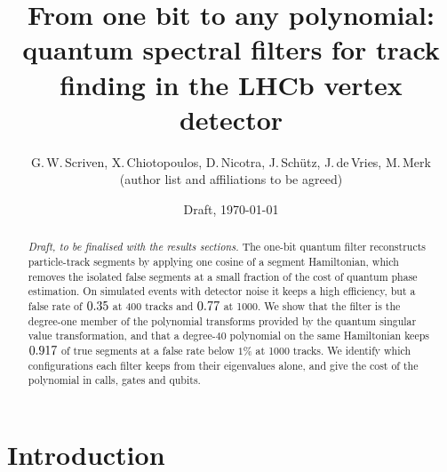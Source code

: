\documentclass[11pt,a4paper]{article}
\title{From one bit to any polynomial:\\ quantum spectral filters for track finding in the LHCb vertex detector}
\author{G.\,W.\,Scriven, X.\,Chiotopoulos, D.\,Nicotra, J.\,Sch\"utz, J.\,de\,Vries, M.\,Merk\\
\small (author list and affiliations to be agreed)}
\date{Draft, \today}
\begin{document}
\maketitle

\begin{abstract}
\noindent\textit{Draft, to be finalised with the results sections.}
The one-bit quantum filter reconstructs particle-track segments by applying one cosine of a
segment Hamiltonian, which removes the isolated false segments at a small fraction of the cost
of quantum phase estimation. On simulated events with detector noise it keeps a high
efficiency, but a false rate of $0.35$ at 400 tracks and $0.77$
at 1000. We show that the filter is the degree-one member of the polynomial transforms
provided by the quantum singular value transformation, and that a degree-40 polynomial on the
same Hamiltonian keeps $0.917$ of true segments at a false rate below $1\%$ at 1000
tracks. We identify which configurations each filter keeps from their eigenvalues alone, and
give the cost of the polynomial in calls, gates and qubits.
\end{abstract}

\section{Introduction}
\end{document}
